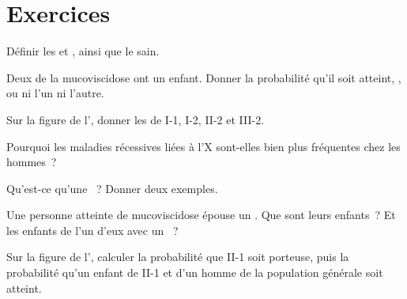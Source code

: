 \section{Exercices}

\begin{exercise}[$\star$]\label{exo:g11:genes-and-disease:1}
Définir les   et , ainsi que le  sain.
\end{exercise}

\begin{exercise}[$\star$]\label{exo:g11:genes-and-disease:2}
Deux  de la mucoviscidose ont un enfant. Donner la probabilité
qu'il soit atteint, , ou ni l'un ni l'autre.
\end{exercise}

\begin{exercise}[$\star$]\label{exo:g11:genes-and-disease:3}
Sur la figure de l', donner les  de I-1,
I-2, II-2 et III-2.
\end{exercise}

\begin{exercise}[$\star$]\label{exo:g11:genes-and-disease:4}
Pourquoi les maladies récessives liées à l'X sont-elles bien plus
fréquentes chez les hommes~?
\end{exercise}

\begin{exercise}[$\star$]\label{exo:g11:genes-and-disease:5}
Qu'est-ce qu'une ~? Donner deux exemples.
\end{exercise}

\begin{exercise}[$\star\star$]\label{exo:g11:genes-and-disease:6}
Une personne atteinte de mucoviscidose épouse un . Que sont
leurs enfants~? Et les enfants de l'un d'eux avec un ~?
\end{exercise}

\begin{exercise}[$\star\star$]\label{exo:g11:genes-and-disease:7}
Sur la figure de l', calculer la probabilité que II-1
soit porteuse, puis la probabilité qu'un enfant de II-1 et d'un homme
de la population générale soit atteint.
\end{exercise}

